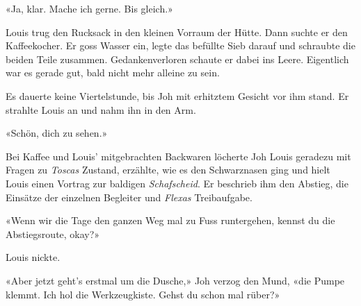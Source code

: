 «Ja, klar. Mache ich gerne. Bis gleich.»

Louis trug den Rucksack in den kleinen Vorraum der Hütte. Dann suchte er
den Kaffeekocher. Er goss Wasser ein, legte das befüllte Sieb darauf und
schraubte die beiden Teile zusammen. Gedankenverloren schaute er dabei ins Leere. 
Eigentlich war es gerade gut, bald nicht mehr alleine zu sein.

Es dauerte keine Viertelstunde, bis Joh mit erhitztem Gesicht vor ihm
stand. Er strahlte Louis an und nahm ihn in den Arm.

«Schön, dich zu sehen.»

Bei Kaffee und Louis’ mitgebrachten Backwaren löcherte Joh
Louis geradezu mit Fragen zu \emph{Toscas} Zustand, erzählte, wie es den
Schwarznasen ging und hielt Louis einen Vortrag zur baldigen
\emph{Schafscheid}. Er beschrieb ihm den Abstieg, die Einsätze der
einzelnen Begleiter und \emph{Flexas} Treibaufgabe.

«Wenn wir die Tage den ganzen Weg mal zu Fuss runtergehen, kennst du
die Abstiegsroute, okay?»

Louis nickte.

«Aber jetzt geht’s erstmal um die Dusche,» Joh verzog den Mund, «die Pumpe klemmt. Ich hol die Werkzeugkiste. Gehst du schon
mal rüber?»

